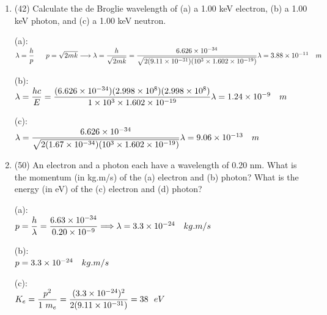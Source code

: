 \documentclass[fleqn]{article}
\begin{document}
  \begin{enumerate}
    \item (42) Calculate the de Broglie wavelength of (a) a 1.00 keV electron, (b) a 1.00 keV photon, and (c) a 1.00 keV neutron.

      \textcolor{hwColor}{ 
        (a): \\ 
        $ 
          \lambda = \dfrac{h}{p} ~~~~~ p=\sqrt{2mk} \\
          \\
          \longrightarrow \lambda=\dfrac{h}{\sqrt{2mk}}=\dfrac{6.626 \times 10^{-34}}{\sqrt{2(9.11 \times 10^{-31})(10^3 \times 1.602 \times 10^{-19})}} \\
          \\
          \lambda = 3.88 \times 10^{-11} ~~~ m
        $ 
      }

      \textcolor{hwColor}{ 
        (b): \\ 
        $ 
          \lambda = \dfrac{hc}{E}=\dfrac{(6.626 \times 10^{-34})(2.998 \times 10^8)(2.998 \times 10^8)}{1 \times 10^3 \times 1.602 \times 10^{-19}} \\
          \\
          \lambda = 1.24 \times 10^{-9} ~~~ m
        $ 
      }

      \textcolor{hwColor}{ 
        (c): \\ 
        $ 
          \lambda = \dfrac{6.626 \times 10^{-34}}{\sqrt{2(1.67 \times 10^{-34})(10^3 \times 1.602 \times 10^{-19})}} \\
          \\
          \lambda = 9.06 \times 10^{-13} ~~~ m
        $ 
      }


    \item (50) An electron and a photon each have a wavelength of 0.20 nm. What is the momentum (in kg.m/s) of the (a) electron and (b) photon? What is the energy (in eV) of the (c) electron and (d) photon?

      \textcolor{hwColor}{
        (a): \\
        $
          p=\dfrac{h}{\lambda}=\dfrac{6.63 \times 10^{-34}}{0.20 \times 10^{-9}} \Longrightarrow \lambda = 3.3 \times 10^{-24} ~~~ kg.m/s \\
        $ 
      }

      \textcolor{hwColor}{
        (b): \\
        $
          p=3.3 \times 10^{-24} ~~~ kg.m/s \\
        $
      }

      \textcolor{hwColor}{
        (c): \\
        $
          K_e=\dfrac{p^2}{1~m_e}=\dfrac{(3.3 \times 10^{-24})^2}{2(9.11 \times 10^{-31})}=38 ~~ eV \\
        $
      }


\end{enumerate}
\end{document}
